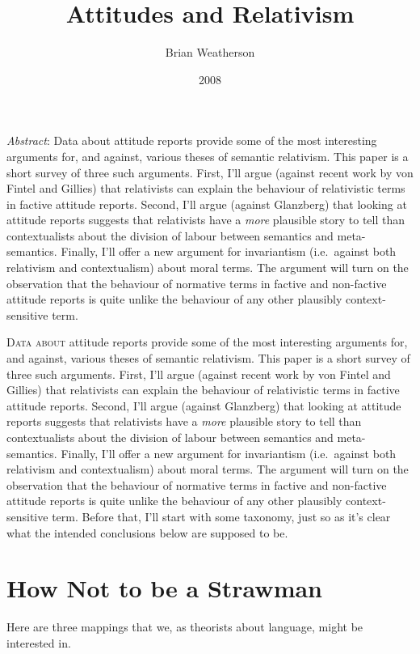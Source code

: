 \documentclass[
  11pt,
  letterpaper,
  DIV=11,
  numbers=noendperiod,
  twoside]{scrartcl}
\title{Attitudes and Relativism}
\author{Brian Weatherson}
\date{2008}
\renewenvironment{abstract}
 {\vspace{-1.25cm}
 \quotation\small\noindent\emph{Abstract}:}
 {\endquotation}
\renewenvironment{abstract}
 {\quotation\small\noindent\emph{Abstract}:}
 {\endquotation\vspace{-0.02cm}}
\begin{document}
\maketitle
\begin{abstract}
Data about attitude reports provide some of the most interesting
arguments for, and against, various theses of semantic relativism. This
paper is a short survey of three such arguments. First, I'll argue
(against recent work by von Fintel and Gillies) that relativists can
explain the behaviour of relativistic terms in factive attitude reports.
Second, I'll argue (against Glanzberg) that looking at attitude reports
suggests that relativists have a \emph{more} plausible story to tell
than contextualists about the division of labour between semantics and
meta-semantics. Finally, I'll offer a new argument for invariantism
(i.e.~against both relativism and contextualism) about moral terms. The
argument will turn on the observation that the behaviour of normative
terms in factive and non-factive attitude reports is quite unlike the
behaviour of any other plausibly context-sensitive term.
\end{abstract}


\lettrine{D}{ata about} attitude reports provide some of the most
interesting arguments for, and against, various theses of semantic
relativism. This paper is a short survey of three such arguments. First,
I'll argue (against recent work by von Fintel and Gillies) that
relativists can explain the behaviour of relativistic terms in factive
attitude reports. Second, I'll argue (against Glanzberg) that looking at
attitude reports suggests that relativists have a \emph{more} plausible
story to tell than contextualists about the division of labour between
semantics and meta-semantics. Finally, I'll offer a new argument for
invariantism (i.e.~against both relativism and contextualism) about
moral terms. The argument will turn on the observation that the
behaviour of normative terms in factive and non-factive attitude reports
is quite unlike the behaviour of any other plausibly context-sensitive
term. Before that, I'll start with some taxonomy, just so as it's clear
what the intended conclusions below are supposed to be.

\section{How Not to be a Strawman}\label{how-not-to-be-a-strawman}

Here are three mappings that we, as theorists about language, might be
interested in.
\end{document}
